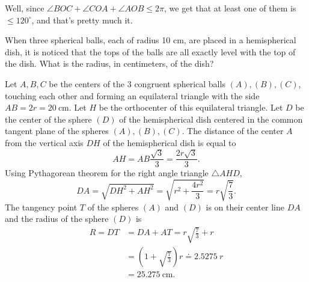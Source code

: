 \documentclass[12pt,a4paper]{memoir}
\theoremstyle{definition}
\begin{document}
\begin{solution}[name={Solution by Grobber}] 
	Well, since $\angle BOC+\angle COA+\angle AOB\le 2\pi$, we get that at least one of them is $\le 120^{\circ}$, and that's pretty much it.
\end{solution}




\begin{question}[name={1999 Australian Math Competition}]
	When three spherical balls, each of radius 10 cm, are placed in a hemispherical dish, it is noticed that the tops of the balls are all exactly level with the top of the dish. What is the radius, in centimeters, of the dish?
\end{question}



\begin{solution}[name={Solution by Yetti}] 
	Let $A, B, C$ be the centers of the 3 congruent spherical balls $(A), (B), (C)$, touching each other and forming an equilateral triangle with the side $AB = 2r = 20\ \text{cm}$. Let $H$ be the orthocenter of this equilateral triangle. Let $D$ be the center of the sphere $(D)$ of the hemispherical dish centered in the common tangent plane of the spheres $(A), (B), (C)$. The distance of the center $A$ from the vertical axis $DH$ of the hemispherical dish is equal to \[AH = AB \frac{\sqrt 3}{3} = \frac{2r \sqrt 3}{3}.\]
	Using Pythagorean theorem for the right angle triangle $\triangle AHD$,
	\[DA = \sqrt{DH^2 + AH^2} = \sqrt{r^2 + \frac{4r^2}{3}} = r \sqrt{\frac 7 3}.\]
	The tangency point $T$ of the spheres $(A)$ and  $(D)$ is on their center line $DA$ and the radius of the sphere $(D)$ is
	\begin{align*}
		R = DT &= DA + AT = r \sqrt{\frac 7 3} + r \\ 
		&= \left(1 + \sqrt{\frac 7 3}\right) r \doteq 2.5275\ r \\
		&= 25. 275\ \text{cm}.
	\end{align*}
\end{solution}
\end{document}
